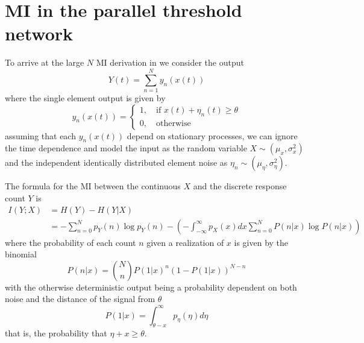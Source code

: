 \chapter{MI in the parallel threshold network}
\label{app:MI in net}
To arrive at the large $N$ MI derivation in \cite{stocksInformationTransmissionParallel2001} we consider the output
\begin{equation}
    Y(t) = \sum_{n=1}^{N} y_n(x(t))
\end{equation}
where the single element output is given by
\begin{equation}
    y_n(x(t)) = 
    \begin{cases}
        1,\quad \text{if } x(t) +\eta_n(t)\geq \theta\\
        0,\quad \text{otherwise}
    \end{cases}
\end{equation}
assuming that each $y_n(x(t))$ depend on stationary processes, we can ignore the time dependence and model the input as the random variable $X\sim (\mu_x,\sigma^2_x)$ and the independent identically distributed element noise as $\eta_n \sim(\mu_\eta, \sigma^2_\eta)$. 

The formula for the MI between the continuous $X$ and the discrete response count $Y$ is
\begin{align}
    I(Y;X) &= H(Y) - H(Y|X)\\
    &=-\sum_{n=0}^N p_Y(n)\log p_Y(n) - \left( -\int_{-\infty}^{\infty}p_X(x)dx\sum_{n=0}^N P(n|x)\log P(n|x)  \right) 
\end{align}
where the probability of each count $n$ given a realization of $x$ is given by the binomial
\begin{equation}
    \label{eq:app-bin count}
    P(n|x) = \binom{N}{n} P(1|x)^n (1-P(1|x))^{N-n}
\end{equation}
with the otherwise deterministic output being a probability dependent on both noise and the distance of the signal from $\theta$
\begin{equation}
    P(1|x) = \int_{\theta - x}^\infty p_\eta(\eta)d\eta
\end{equation}
that is, the probability that $\eta+x\geq\theta$.

